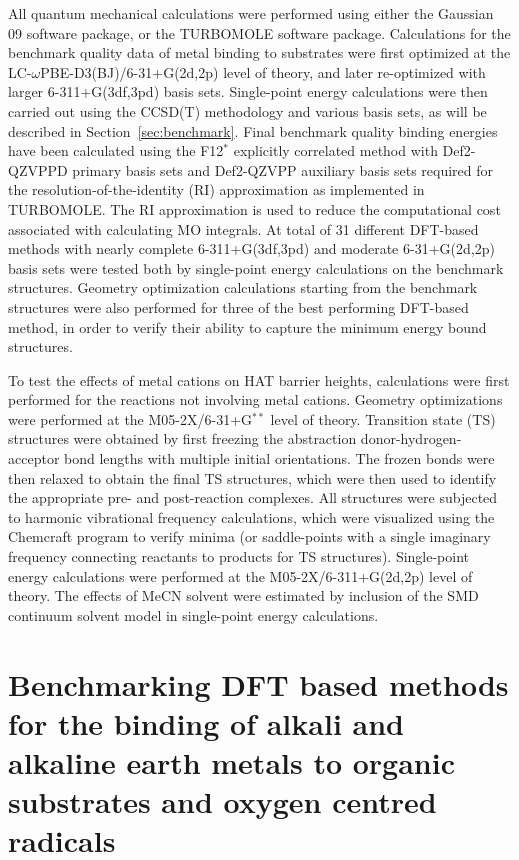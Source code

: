 All quantum mechanical calculations were performed using either the Gaussian 09 software package,\cite{Frisch2009} or the TURBOMOLE software package.\cite{turbomole} Calculations for the benchmark quality data of metal binding to substrates were first optimized at the LC-$\omega$PBE-D3(BJ)/6-31+G(2d,2p) level of theory, and later re-optimized with larger 6-311+G(3df,3pd) basis sets. Single-point energy calculations were then carried out using the CCSD(T) methodology and various basis sets, as will be described in Section~\ref{sec:benchmark}. Final benchmark quality binding energies have been calculated using the F12$^*$ explicitly correlated method with Def2-QZVPPD primary basis sets and Def2-QZVPP auxiliary basis sets required for the resolution-of-the-identity (RI) approximation as implemented in TURBOMOLE. The RI approximation is used to reduce the computational cost associated with calculating MO integrals.\cite{note-book} At total of 31 different DFT-based methods with nearly complete 6-311+G(3df,3pd) and moderate 6-31+G(2d,2p) basis sets were tested both by single-point energy calculations on the benchmark structures. Geometry optimization calculations starting from the benchmark structures were also performed for three of the best performing DFT-based method, in order to verify their ability to capture the minimum energy bound structures.

To test the effects of metal cations on HAT barrier heights, calculations were first performed for the reactions not involving metal cations. Geometry optimizations were performed at the M05-2X/6-31+G$^{**}$ level of theory. Transition state (TS) structures were obtained by first freezing the abstraction donor-hydrogen-acceptor bond lengths with multiple initial orientations. The frozen bonds were then relaxed to obtain the final TS structures, which were then used to identify the appropriate pre- and post-reaction complexes. All structures were subjected to harmonic vibrational frequency calculations, which were visualized using the Chemcraft program\cite{ccraft} to verify minima (or saddle-points with a single imaginary frequency connecting reactants to products for TS structures). Single-point energy calculations were performed at the M05-2X/6-311+G(2d,2p) level of theory. The effects of MeCN solvent were estimated by inclusion of the SMD continuum solvent model in single-point energy calculations.


\section{Benchmarking DFT based methods for the binding of alkali and alkaline earth metals to organic substrates and oxygen centred radicals}
\label{sec:benchmark}

